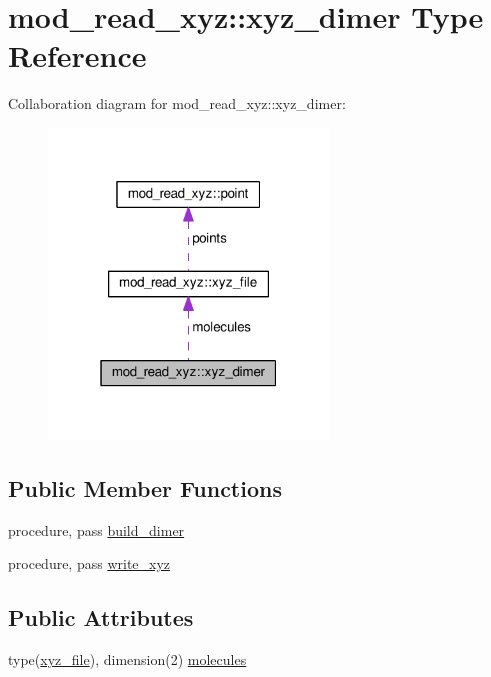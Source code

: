 \hypertarget{structmod__read__xyz_1_1xyz__dimer}{}\section{mod\+\_\+read\+\_\+xyz\+:\+:xyz\+\_\+dimer Type Reference}
\label{structmod__read__xyz_1_1xyz__dimer}


Collaboration diagram for mod\+\_\+read\+\_\+xyz\+:\+:xyz\+\_\+dimer\+:\nopagebreak
\begin{figure}[H]
\begin{center}
\leavevmode
\includegraphics[width=211pt]{structmod__read__xyz_1_1xyz__dimer__coll__graph}
\end{center}
\end{figure}
\subsection*{Public Member Functions}
\begin{DoxyCompactItemize}
\item 
procedure, pass \hyperlink{structmod__read__xyz_1_1xyz__dimer_ad0dbe3dddad53d4031df233102327f8c}{build\+\_\+dimer}
\item 
procedure, pass \hyperlink{structmod__read__xyz_1_1xyz__dimer_a452b6927d8e712dd73467dd57b9141d8}{write\+\_\+xyz}
\end{DoxyCompactItemize}
\subsection*{Public Attributes}
\begin{DoxyCompactItemize}
\item 
type(\hyperlink{structmod__read__xyz_1_1xyz__file}{xyz\+\_\+file}), dimension(2) \hyperlink{structmod__read__xyz_1_1xyz__dimer_af7e03e5b57bc4a39e4905ff0aecbf6b6}{molecules}
\end{DoxyCompactItemize}


